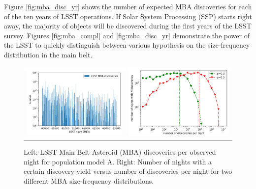 Figure \ref{fig:mba_disc_yr} shows the number of expected \gls{MBA} discoveries for each of the ten years of \gls{LSST} operations. If Solar System Processing (\gls{SSP}) starts right away, the majority of objects will be discovered during the first years of the \gls{LSST} survey. Figures \ref{fig:mba_compl} and \ref{fig:mba_disc_yr} demonstrate the power of the \gls{LSST} to quickly distinguish between various hypothesis on the size-frequency distribution in the main belt. 
%
\begin{figure}[tb!]
\begin{center}
\begin{tabular}{cc}
\includegraphics[width=0.5\linewidth]{figs/disc_per_night.png} &
\includegraphics[width=0.50\linewidth]{figs/disc_stat.png}
\end{tabular}
\end{center}
\caption{Left: \gls{LSST} Main Belt Asteroid (\gls{MBA}) discoveries per observed night for population model A. Right: Number of nights with a certain discovery yield versus number of discoveries per night for two different \gls{MBA} size-frequency distributions.}
\label{fig:mba_disc_stats}       %
\end{figure}

